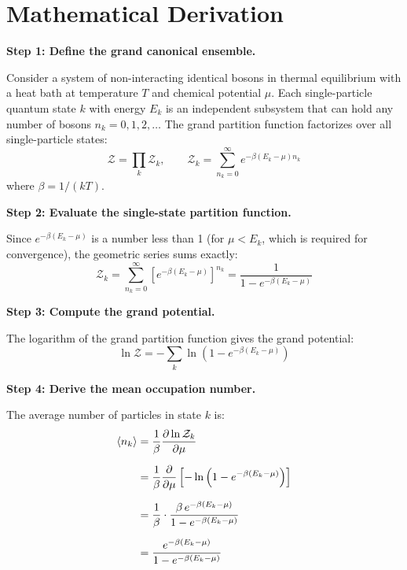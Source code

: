 \section*{Mathematical Derivation}

\textbf{Step 1: Define the grand canonical ensemble.}

Consider a system of non-interacting identical bosons in thermal equilibrium with a heat bath at temperature $T$ and chemical potential $\mu$. Each single-particle quantum state $k$ with energy $E_k$ is an independent subsystem that can hold any number of bosons $n_k = 0, 1, 2, \ldots$ The grand partition function factorizes over all single-particle states:
\begin{equation}
\mathcal{Z} = \prod_k \mathcal{Z}_k, \qquad \mathcal{Z}_k = \sum_{n_k=0}^{\infty} e^{-\beta(E_k - \mu)n_k}
\end{equation}
where $\beta = 1/(kT)$.

\textbf{Step 2: Evaluate the single-state partition function.}

Since $e^{-\beta(E_k - \mu)}$ is a number less than 1 (for $\mu < E_k$, which is required for convergence), the geometric series sums exactly:
\begin{equation}
\mathcal{Z}_k = \sum_{n_k=0}^{\infty} \left[e^{-\beta(E_k - \mu)}\right]^{n_k} = \frac{1}{1 - e^{-\beta(E_k - \mu)}}
\end{equation}

\textbf{Step 3: Compute the grand potential.}

The logarithm of the grand partition function gives the grand potential:
\begin{equation}
\ln \mathcal{Z} = -\sum_k \ln\left(1 - e^{-\beta(E_k - \mu)}\right)
\end{equation}

\textbf{Step 4: Derive the mean occupation number.}

The average number of particles in state $k$ is:
\begin{align}
\langle n_k \rangle &= \frac{1}{\beta} \frac{\partial \ln \mathcal{Z}_k}{\partial \mu} \notag \\[6pt]
&= \frac{1}{\beta} \frac{\partial}{\partial \mu} \left[-\ln\left(1 - e^{-\beta(E_k - \mu)}\right)\right] \notag \\[6pt]
&= \frac{1}{\beta} \cdot \frac{\beta \, e^{-\beta(E_k - \mu)}}{1 - e^{-\beta(E_k - \mu)}} \notag \\[6pt]
&= \frac{e^{-\beta(E_k - \mu)}}{1 - e^{-\beta(E_k - \mu)}}
\end{align}

